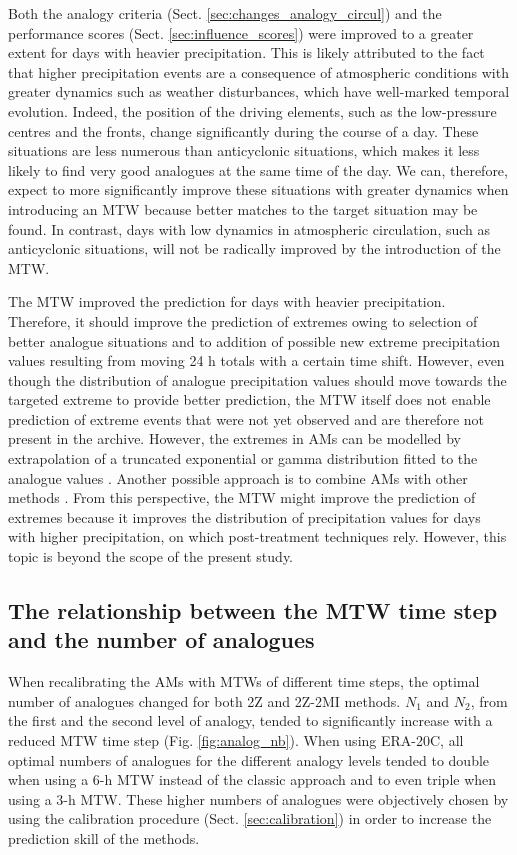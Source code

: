 \documentclass[hess, manuscript]{copernicus}
\begin{document}
	Both the analogy criteria (Sect. \ref{sec:changes_analogy_circul}) and the performance scores (Sect. \ref{sec:influence_scores}) were improved to a greater extent for days with heavier precipitation. This is likely attributed to the fact that higher precipitation events are a consequence of atmospheric conditions with greater dynamics such as weather disturbances, which have well-marked temporal evolution. Indeed, the position of the driving elements, such as the low-pressure centres and the fronts, change significantly during the course of a day. These situations are less numerous than anticyclonic situations, which makes it less likely to find very good analogues at the same time of the day. We can, therefore, expect to more significantly improve these situations with greater dynamics when introducing an MTW because better matches to the target situation may be found. In contrast, days with low dynamics in atmospheric circulation, such as anticyclonic situations, will not be radically improved by the introduction of the MTW.
	
	The MTW improved the prediction for days with heavier precipitation. Therefore, it should improve the prediction of extremes owing to selection of better analogue situations and to addition of possible new extreme precipitation values resulting from moving 24 h totals with a certain time shift. However, even though the distribution of analogue precipitation values should move towards the targeted extreme to provide better prediction, the MTW itself does not enable prediction of extreme events that were not yet observed and are therefore not present in the archive. However, the extremes in AMs can be modelled by extrapolation of a truncated exponential or gamma distribution fitted to the analogue values \citep{Obled2002}. Another possible approach is to combine AMs with other methods \citep[e.g.][]{Chardon2014}. From this perspective, the MTW might improve the prediction of extremes because it improves the distribution of precipitation values for days with higher precipitation, on which post-treatment techniques rely. However, this topic is beyond the scope of the present study.
	
	
	\subsection{The relationship between the MTW time step and the number of analogues}
	\label{sec:increase_analognb}
	
	When recalibrating the AMs with MTWs of different time steps, the optimal number of analogues changed for both 2Z and 2Z-2MI methods. $N_{1}$ and $N_{2}$, from the first and the second level of analogy, tended to significantly increase with a reduced MTW time step (Fig. \ref{fig:analog_nb}). When using ERA-20C, all optimal numbers of analogues for the different analogy levels tended to double when using a 6-h MTW instead of the classic approach and to even triple when using a 3-h MTW. These higher numbers of analogues were objectively chosen by using the calibration procedure (Sect. \ref{sec:calibration}) in order to increase the prediction skill of the methods.
	
\end{document}
